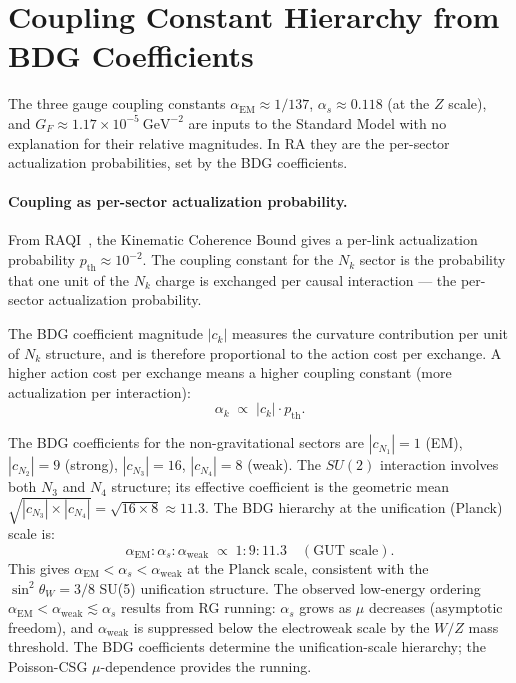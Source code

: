 \documentclass[11pt,a4paper]{article}
\begin{document}
\section{Coupling Constant Hierarchy from BDG Coefficients}
\label{sec:couplings}

The three gauge coupling constants $\alpha_{\mathrm{EM}} \approx 1/137$,
$\alpha_s \approx 0.118$ (at the $Z$ scale), and $G_F \approx 1.17 \times
10^{-5}~\text{GeV}^{-2}$ are inputs to the Standard Model with no
explanation for their relative magnitudes. In RA they are the per-sector
actualization probabilities, set by the BDG coefficients.

\paragraph{Coupling as per-sector actualization probability.}
From RAQI~\citep{Sandeman2026RAQI}, the Kinematic Coherence Bound gives a
per-link actualization probability $p_{\mathrm{th}} \approx 10^{-2}$.
The coupling constant for the $N_k$ sector is the probability that one
unit of the $N_k$ charge is exchanged per causal interaction --- the
per-sector actualization probability.

The BDG coefficient magnitude $|c_k|$ measures the curvature contribution
per unit of $N_k$ structure, and is therefore proportional to the action
cost per exchange. A higher action cost per exchange means a higher coupling
constant (more actualization per interaction):
\begin{equation}
  \alpha_k \;\propto\; |c_k| \cdot p_{\mathrm{th}}.
  \label{eq:coupling_hierarchy}
\end{equation}

The BDG coefficients for the non-gravitational sectors are
$|c_{N_1}| = 1$ (EM), $|c_{N_2}| = 9$ (strong), $|c_{N_3}| = 16$,
$|c_{N_4}| = 8$ (weak). The $SU(2)$ interaction involves both $N_3$
and $N_4$ structure; its effective coefficient is the geometric mean
$\sqrt{|c_{N_3}|\times|c_{N_4}|} = \sqrt{16\times 8} \approx 11.3$.
The BDG hierarchy at the unification (Planck) scale is:
\begin{equation}
  \alpha_{\mathrm{EM}} : \alpha_s : \alpha_{\mathrm{weak}}
  \;\propto\; 1 : 9 : 11.3
  \quad (\text{GUT scale}).
  \label{eq:coupling_ratios}
\end{equation}
This gives $\alpha_{\mathrm{EM}} < \alpha_s < \alpha_{\mathrm{weak}}$
at the Planck scale, consistent with the $\sin^2\theta_W = 3/8$
SU(5) unification structure. The observed low-energy ordering
$\alpha_{\mathrm{EM}} < \alpha_{\mathrm{weak}} \lesssim \alpha_s$
results from RG running: $\alpha_s$ grows as $\mu$ decreases
(asymptotic freedom), and $\alpha_{\mathrm{weak}}$ is suppressed
below the electroweak scale by the $W/Z$ mass threshold.
The BDG coefficients determine the unification-scale hierarchy;
the Poisson-CSG $\mu$-dependence provides the running.
\end{document}
